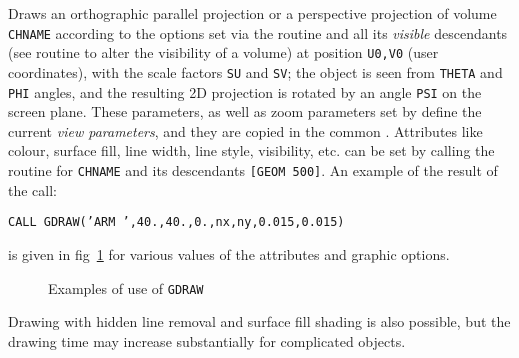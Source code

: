      
 
Draws an orthographic parallel projection or
a perspective projection 
of volume {\tt CHNAME} according to the options set via the 
routine  and all its {\it visible} descendants
(see routine  to alter the visibility of a volume)
at position {\tt U0,V0} (user coordinates), with the scale
factors {\tt SU} and {\tt SV};
the object is seen from {\tt THETA} and {\tt PHI} angles, and
the resulting 2D projection is rotated
by an angle {\tt PSI} on the screen plane.
These parameters, as well as zoom parameters set by 
define the current {\it view parameters}, and they are copied
in the common . Attributes like colour, surface fill,
line width, line style, visibility, etc. can be set by calling 
the  routine for {\tt CHNAME} and its descendants 
{\tt [GEOM 500]}. An example of the result of the call:

\begin{center}
{\tt CALL GDRAW('ARM ',40.,40.,0.,nx,ny,0.015,0.015) }
\end{center}

is given in fig~\ref{draw110-1} for various values of the attributes
and graphic options.

\begin{figure}[hbt]
      \centering
      \caption{Examples of use of {\tt GDRAW}}
      \label{draw110-1}
\end{figure}

Drawing with hidden line removal and surface fill shading is also possible, 
but the drawing time may increase substantially for complicated 
objects.

